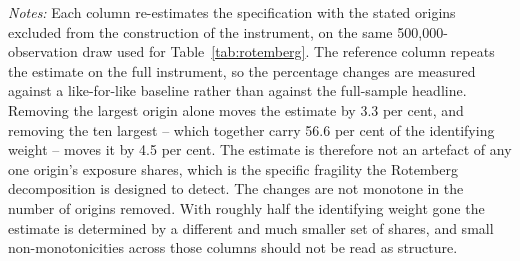 \begin{table}[!htbp]
\centering
\caption{Sensitivity of the Estimate to Removing the Highest-Weighted Origins}
\label{tab:rotemberg_sensitivity}
\begin{minipage}{\textwidth}
\footnotesize
\vspace{4pt}
\textit{Notes:} Each column re-estimates the specification with the stated origins excluded from the construction of the instrument, on the same 500{,}000-observation draw used for Table~\ref{tab:rotemberg}. The reference column repeats the estimate on the full instrument, so the percentage changes are measured against a like-for-like baseline rather than against the full-sample headline. Removing the largest origin alone moves the estimate by 3.3 per cent, and removing the ten largest -- which together carry 56.6 per cent of the identifying weight -- moves it by 4.5 per cent. The estimate is therefore not an artefact of any one origin's exposure shares, which is the specific fragility the Rotemberg decomposition is designed to detect. The changes are not monotone in the number of origins removed. With roughly half the identifying weight gone the estimate is determined by a different and much smaller set of shares, and small non-monotonicities across those columns should not be read as structure.
\end{minipage}
\end{table}

